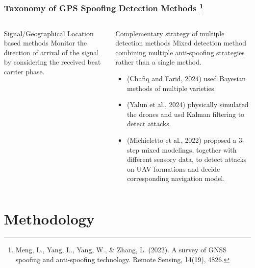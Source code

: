 \documentclass[aspectratio=169, 8pt]{beamer}
\begin{document}
\begin{frame}
\begin{columns}
\begin{column}{0.5\textwidth}
        
        
    \end{column}
\end{columns}



\end{frame}

\begin{frame}
\frametitle{Taxonomy of GPS Spoofing Detection Methods \footnote{Meng, L., Yang, L., Yang, W., & Zhang, L. (2022). A survey of GNSS spoofing and anti-spoofing technology. Remote Sensing, 14(19), 4826.}}

\begin{columns}
    \begin{column}{0.5\textwidth}
         \begin{block}{ Signal/Geographical Location based methods}
            Monitor the direction of arrival of the signal by considering the received beat carrier phase.
        \end{block}
    \end{column}
        
    \begin{column}{0.5\textwidth}
        \begin{block}{ Complementary strategy of multiple detection methods}
            Mixed detection method combining multiple anti-spooﬁng strategies rather than a single method.
        \end{block}
        {\small
        \begin{itemize}
            \item (Chafiq and Farid, 2024) used Bayesian methods of multiple varieties. 
            \item  (Yalun et al., 2024) physically simulated the drones and usd Kalman filtering to detect attacks.
            \item (Michieletto et al., 2022) proposed a 3-step mixed modelings, together with different sensory data, to detect attacks on UAV formations and decide corresponding navigation model.
        \end{itemize} 
        }
    \end{column}
\end{columns}

\end{frame}



\section{Methodology}
\end{document}
